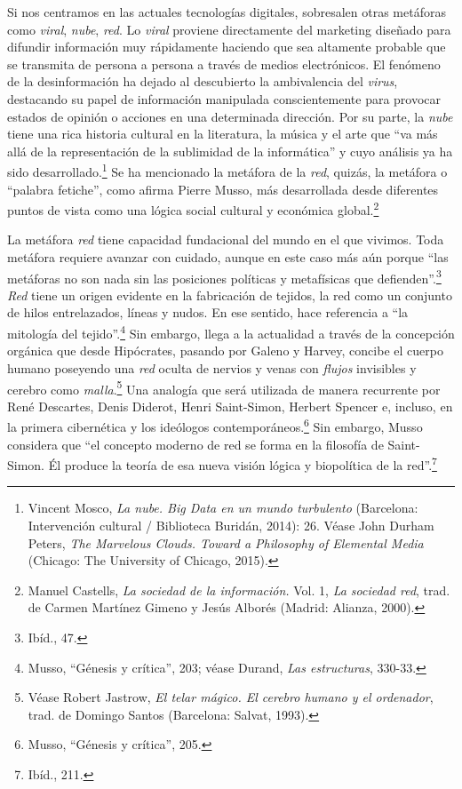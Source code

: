 \documentclass{tufte-handout}
\begin{document}
Si nos centramos en las actuales tecnologías digitales, sobresalen otras
metáforas como \emph{viral}, \emph{nube}, \emph{red}. Lo \emph{viral}
proviene directamente del marketing diseñado para difundir información
muy rápidamente haciendo que sea altamente probable que se transmita de
persona a persona a través de medios electrónicos. El fenómeno de la
desinformación ha dejado al descubierto la ambivalencia del
\emph{virus}, destacando su papel de información manipulada
conscientemente para provocar estados de opinión o acciones en una
determinada dirección. Por su parte, la \emph{nube} tiene una rica
historia cultural en la literatura, la música y el arte que ``va más
allá de la representación de la sublimidad de la informática'' y cuyo
análisis ya ha sido desarrollado.\footnote{Vincent Mosco, \emph{La nube.
  Big Data en un mundo turbulento} (Barcelona: Intervención cultural /
  Biblioteca Buridán, 2014): 26. Véase John Durham Peters, \emph{The
  Marvelous Clouds. Toward a Philosophy of Elemental Media} (Chicago:
  The University of Chicago, 2015).} Se ha mencionado la metáfora de la
\emph{red}, quizás, la metáfora o ``palabra fetiche'', como afirma
Pierre Musso, más desarrollada desde diferentes puntos de vista como una
lógica social cultural y económica global.\footnote{Manuel Castells,
  \emph{La sociedad de la información.} Vol. 1, \emph{La sociedad red},
  trad. de Carmen Martínez Gimeno y Jesús Alborés (Madrid: Alianza,
  2000).}

La metáfora \emph{red} tiene capacidad fundacional del mundo en el que
vivimos. Toda metáfora requiere avanzar con cuidado, aunque en este caso
más aún porque ``las metáforas no son nada sin las posiciones políticas
y metafísicas que defienden''.\footnote{Ibíd., 47.} \emph{Red} tiene un
origen evidente en la fabricación de tejidos, la red como un conjunto de
hilos entrelazados, líneas y nudos. En ese sentido, hace referencia a
``la mitología del tejido''.\footnote{Musso, ``Génesis y crítica'', 203;
  véase Durand, \emph{Las estructuras}, 330-33.} Sin embargo, llega a la
actualidad a través de la concepción orgánica que desde Hipócrates,
pasando por Galeno y Harvey, concibe el cuerpo humano poseyendo una
\emph{red} oculta de nervios y venas con \emph{flujos} invisibles y
cerebro como \emph{malla}.\footnote{Véase Robert Jastrow, \emph{El telar
  mágico. El cerebro humano y el ordenador}, trad. de Domingo Santos
  (Barcelona: Salvat, 1993).} Una analogía que será utilizada de manera
recurrente por René Descartes, Denis Diderot, Henri Saint-Simon, Herbert
Spencer e, incluso, en la primera cibernética y los ideólogos
contemporáneos.\footnote{Musso, ``Génesis y crítica'', 205.} Sin
embargo, Musso considera que ``el concepto moderno de red se forma en la
filosofía de Saint-Simon. Él produce la teoría de esa nueva visión
lógica y biopolítica de la red''.\footnote{Ibíd., 211.}
\end{document}

